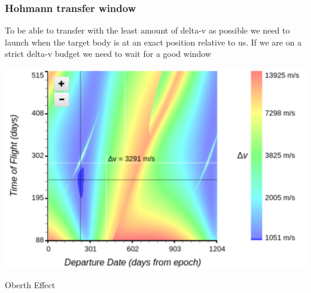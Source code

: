\begin{frame}
    \frametitle{Hohmann transfer window}
    \begin{block}{}
        To be able to transfer with the least amount of delta-v as possible we need to launch when the target body is
        at an exact position relative to us. If we are on a strict delta-v budget we need to wait for a good window
    \end{block}
    \begin{block}{}
        \begin{center}
            \includegraphics[scale=0.08]{images/hohmann_transfer_window}
        \end{center}
    \end{block}
\end{frame}
{
%
\begin{frame}[t]{Oberth Effect}
\end{frame}
}
